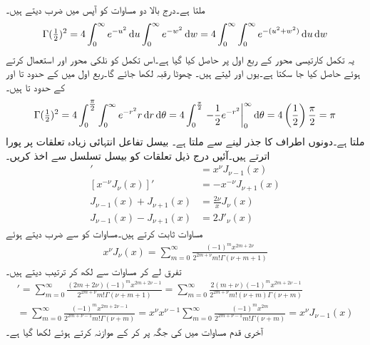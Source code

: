ملتا ہے۔درج بالا دو مساوات کو آپس میں ضرب دیتے ہیں۔
\begin{align*}
\Gamma(\tfrac{1}{2})^2=4\int_{0}^{\infty}e^{-u^2}\dif u \int_{0}^{\infty}e^{-w^2}\dif w=4\int_{0}^{\infty}\int_{0}^{\infty} e^{-(u^2+w^2)}\dif u\dif w
\end{align*}
یہ تکمل کارتیسی محور کے ربع اول پر حاصل کیا گیا ہے۔اس تکمل کو نلکی محور  اور  استعمال کرتے ہوئے حاصل کیا جا سکتا ہے۔یوں  اور  لیتے ہیں۔ چھوٹا رقبہ  لکھا جائے گا۔ربع اول میں  کے حدود  تا  اور  کے حدود  تا   ہیں۔
\begin{align*}
\Gamma(\tfrac{1}{2})^2=4\int_{0}^{\tfrac{\pi}{2}}\int_{0}^{\infty} e^{-r^2} r\dif r\dif \theta=4\int_{0}^{\frac{\pi}{2}}\left. -\frac{1}{2}e^{-r^2}\right|_{0}^{\infty} \dif \theta=4\left(\frac{1}{2}\right)\frac{\pi}{2}=\pi
\end{align*}
ملتا ہے۔دونوں اطراف کا جذر لینے سے  ملتا ہے۔
بیسل تفاعل انتہائی زیادہ تعلقات پر پورا اترتے ہیں۔آئیں درج ذیل تعلقات کو بیسل تسلسل سے اخذ کریں۔
\begin{align}
[x^{\nu}J_{\nu}(x)]'&=x^{\nu}J_{\nu-1}(x) \label{مساوات_بیسل_تعلق_الف}\\
[x^{-\nu}J_{\nu}(x)]'&=-x^{-\nu}J_{\nu+1}(x) \label{مساوات_بیسل_تعلق_ب}\\
J_{\nu-1}(x)+J_{\nu+1}(x)&=\frac{2\nu}{x}J_{\nu}(x) \label{مساوات_بیسل_تعلق_پ}\\
J_{\nu-1}(x)-J_{\nu+1}(x)&=2J'_{\nu}(x) \label{مساوات_بیسل_تعلق_ت}
\end{align}
مساوات  ثابت کرتے ہیں۔مساوات  کو  سے ضرب دیتے ہوئے
\begin{align*}
x^{\nu}J_{\nu}(x)=\sum_{m=0}^{\infty}\frac{(-1)^m x^{2m+2\nu}}{2^{2m+\nu}m!\Gamma(\nu+m+1)}
\end{align*}
تفرق لے کر مساوات  سے  لکھ کر ترتیب دیتے ہیں۔
\begin{multline*}
[x^{\nu}J_{\nu}(x)]'=\sum_{m=0}^{\infty}\frac{(2m+2\nu)(-1)^m x^{2m+2\nu-1}}{2^{2m+\nu}m!\Gamma(\nu+m+1)}=\sum_{m=0}^{\infty}\frac{2(m+\nu)(-1)^m x^{2m+2\nu-1}}{2^{2m+\nu}m!(\nu+m)\Gamma(\nu+m)}\\
=\sum_{m=0}^{\infty}\frac{(-1)^m x^{2m+2\nu-1}}{2^{2m+\nu-1}m!\Gamma(\nu+m)}=x^{\nu}x^{\nu-1}\sum_{m=0}^{\infty}\frac{(-1)^m x^{2m}}{2^{2m+\nu-1}m!\Gamma(\nu+m)}=x^{\nu}J_{\nu-1}(x)
\end{multline*}
آخری قدم مساوات  میں  کی جگہ  پر کر کے موازنہ کرتے ہوئے لکھا گیا ہے۔

